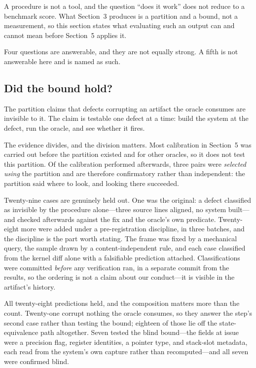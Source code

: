 A procedure is not a tool, and the question ``does it work'' does not reduce to a
benchmark score. What Section~3 produces is a partition and a bound, not a
measurement, so this section states what evaluating such an output can and cannot
mean before Section~5 applies it.

Four questions are answerable, and they are not equally strong. A fifth is not
answerable here and is named as such.

\subsection{Did the bound hold?}

The partition claims that defects corrupting an artifact the oracle consumes are
invisible to it. The claim is testable one defect at a time: build the system at the
defect, run the oracle, and see whether it fires.

The evidence divides, and the division matters. Most calibration in Section~5 was
carried out before the partition existed and for other oracles, so it does not test
this partition. Of the calibration performed afterwards, three pairs were
\emph{selected using} the partition and are therefore confirmatory rather than
independent: the partition said where to look, and looking there succeeded.

Twenty-nine cases are genuinely held out. One was the original: a defect classified as
invisible by the procedure alone---three source lines aligned, no system built---and
checked afterwards against the fix and the oracle's own predicate. Twenty-eight more were
added under a pre-registration discipline, in three batches, and the discipline is the
part worth stating. The frame was fixed by a mechanical query, the sample drawn by a
content-independent rule, and each case classified from the kernel diff alone with a
falsifiable prediction attached. Classifications were committed \emph{before} any
verification ran, in a separate commit from the results, so the ordering is not a
claim about our conduct---it is visible in the artifact's history.

All twenty-eight predictions held, and the composition matters more than the count.
Twenty-one corrupt nothing the oracle consumes, so they answer the step's second
case rather than testing the bound; eighteen of those lie off the
state-equivalence path altogether. Seven tested the blind bound---the fields at issue
were a precision flag, register identities, a pointer type, and stack-slot
metadata, each read from the system's own capture rather than recomputed---and all
seven were confirmed blind.

